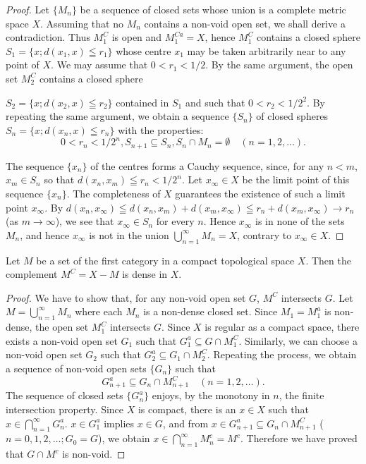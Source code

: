 \begin{proof}
 Let $\{M_{n}\}$ be a sequence of closed sets whose union is a complete metric space $X$. Assuming that no $M_{n}$ contains a non-void open set, we shall derive a contradiction. Thus $M_{1}^{C}$ is open and $M_{1}^{Ca}=X$, hence $M_{1}^{C}$ contains a closed sphere $S_{1}=\{x;d(x_{1},x)\leqq r_{1}\}$ whose centre $x_{1}$ may be taken arbitrarily near to any point of $X$. We may assume that $0<r_{1}<1/2$. By the same argument, the open set $M_{2}^{C}$ contains a closed sphere 

$S_{2} = \{x; d(x_{2}, x) \leqq r_{2}\}$ contained in $S_{1}$ and such that $0 < r_{2} < 1/2^{2}$. By repeating the same argument, we obtain a sequence $\{S_{n}\}$ of closed spheres $S_{n} = \{x; d(x_{n}, x) \leqq r_{n}\}$ with the properties: 
\[
0 < r _{n} < 1 / 2 ^{n}, S _{n+1} \subseteq S _{n}, S _{n} \cap M _{n} = \emptyset \quad (n = 1, 2, \dots). \]

The sequence $\{x_{n}\}$ of the centres forms a Cauchy sequence, since, for any $n < m$, $x_{m} \in S_{n}$ so that $d(x_{n}, x_{m}) \leqq r_{n} < 1/2^{n}$. Let $x_{\infty} \in X$ be the limit point of this sequence $\{x_{n}\}$. The completeness of $X$ guarantees the existence of such a limit point $x_{\infty}$. By $d(x_{n}, x_{\infty}) \leqq d(x_{n}, x_{m}) + d(x_{m}, x_{\infty}) \leqq r_{n} + d(x_{m}, x_{\infty}) \to r_{n}$ (as $m \to \infty$), we see that $x_{\infty} \in S_{n}$ for every $n$. Hence $x_{\infty}$ is in none of the sets $M_{n}$, and hence $x_{\infty}$ is not in the union $\bigcup\limits_{n=1}^{\infty} M_{n} = X$, contrary to $x_{\infty} \in X$. 
\end{proof}

\begin{theoremn} Let $M$ be a set of the first category in a compact topological space $X$. Then the complement $M^C = X- M$ is dense in $X$. 
\end{theoremn}

\begin{proof}
 We have to show that, for any non-void open set $G$, $M^C$ intersects $G$. Let $M = \bigcup\limits_{n=1}^{\infty} M_n$ where each $M_n$ is a non-dense closed set. Since $M_1 = M_1^a$ is non-dense, the open set $M_1^C$ intersects $G$. Since $X$ is regular as a compact space, there exists a non-void open set $G_1$ such that $G_1^a \subseteq G \cap M_1^C$. Similarly, we can choose a non-void open set $G_2$ such that $G_2^a \subseteq G_1 \cap M_2^C$. Repeating the process, we obtain a sequence of non-void open sets $\{G_n\}$ such that 
\[
G _{n+1} ^{a} \subseteq G _{n} \cap M _{n+1} ^{C} \quad (n = 1, 2, \dots). \]
The sequence of closed sets $\{G_n^a\}$ enjoys, by the monotony in $n$, the finite intersection property. Since $X$ is compact, there is an $x \in X$ such that $x \in \bigcap\limits_{n=1}^{\infty} G_n^a$. $x \in G_1^a$ implies $x \in G$, and from $x \in G_{n+1}^a \subseteq G_n \cap M_{n+1}^C$ ( $n = 0, 1, 2, \ldots; G_0 = G$), we obtain $x \in \bigcap\limits_{n=1}^{\infty} M_n^c = M^c$. Therefore we have proved that $G \cap M^c$ is non-void. 
\end{proof}

